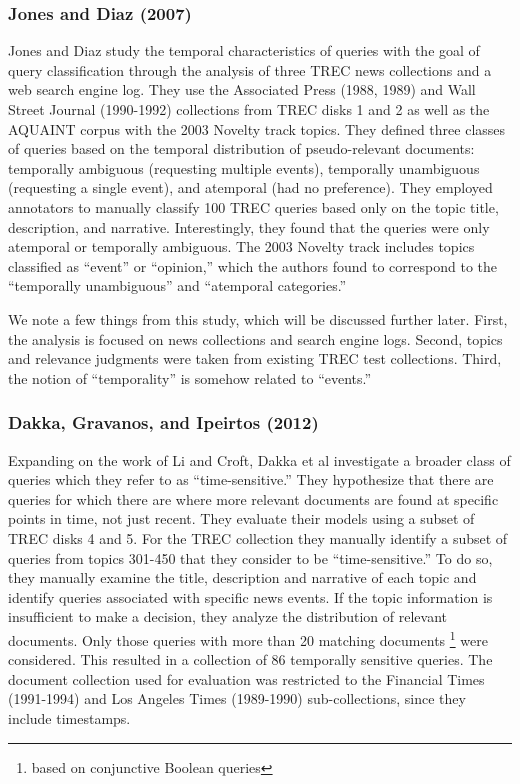 \documentclass{sig-alternate}
\begin{document}
\subsubsection{Jones and Diaz (2007)}
Jones and Diaz \cite{Jones2007} study the temporal characteristics of queries with the goal of query classification through the analysis of three TREC news collections and a web search engine log. They use the Associated Press (1988, 1989) and Wall Street Journal (1990-1992) collections from TREC disks 1 and 2 as well as the AQUAINT corpus with the 2003 Novelty track topics. They defined three classes of queries based on the temporal distribution of pseudo-relevant documents: temporally ambiguous (requesting multiple events),  temporally unambiguous (requesting a single event), and atemporal (had no preference). They employed annotators to  manually classify 100 TREC queries based only on the topic title, description, and narrative.  Interestingly, they found that the queries were only atemporal or temporally ambiguous.  The 2003 Novelty track includes topics classified as ``event'' or ``opinion,'' which the authors found to correspond to the ``temporally unambiguous'' and ``atemporal categories.''  

We note a few things from this study, which will be discussed further later. First, the analysis is focused on news collections and search engine logs. Second, topics and relevance judgments were taken from existing TREC test collections.  Third, the notion of ``temporality'' is somehow related to ``events.'' 

\subsubsection{Dakka, Gravanos, and Ipeirtos (2012)}

Expanding on the work of Li and Croft, Dakka et al \cite{Dakka2012} investigate a broader class of queries which they refer to as ``time-sensitive.'' They hypothesize that there are queries for which there are where more relevant documents are found at specific points in time, not just recent.  They evaluate their models using a subset of TREC disks 4 and 5.  For the TREC collection they manually identify a subset of queries from topics 301-450 that they consider to be ``time-sensitive.'' To do so, they manually examine the title, description and narrative of each topic and identify queries associated with specific news events. If the topic information is insufficient to make a decision, they analyze the distribution of relevant documents.  Only those queries with more than 20 matching documents \footnote{based on conjunctive Boolean queries} were considered.  This resulted in a collection of 86 temporally sensitive queries. The document collection used for evaluation was restricted to the Financial Times (1991-1994) and Los Angeles Times (1989-1990) sub-collections, since they include timestamps. 
\end{document}
